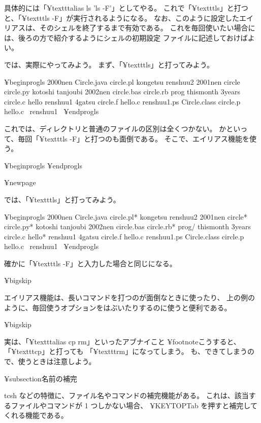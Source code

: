 具体的には「¥texttt{alias ls 'ls -F'}」としてやる。
これで「¥texttt{ls}」と打つと、「¥texttt{ls -F}」が実行されるようになる。
なお、このように設定したエイリアスは、そのシェルを終了するまで有効である。
これを毎回使いたい場合には、後ろの方で紹介するようにシェルの初期設定
ファイルに記述しておけばよい。

では、実際にやってみよう。
まず、「¥texttt{ls}」と打ってみよう。

¥begin{progls}
2000nen         Circle.java     circle.pl       kongetsu        renshuu2
2001nen         circle          circle.py       kotoshi         tanjoubi
2002nen         circle.bas      circle.rb       prog            thismonth
3years          circle.c        hello           renshuu1
4gatsu          circle.f        hello.c         renshuu1.ps
Circle.class    circle.p        hello.c~        renshuu1~
%
¥end{progls}

これでは、ディレクトリと普通のファイルの区別は全くつかない。
かといって、毎回「¥texttt{ls -F}」と打つのも面倒である。
そこで、エイリアス機能を使う。

¥begin{progls}
%
¥end{progls}

¥newpage

では、「¥texttt{ls}」と打ってみよう。

¥begin{progls}
2000nen         Circle.java     circle.pl*      kongetsu        renshuu2
2001nen         circle*         circle.py*      kotoshi         tanjoubi
2002nen         circle.bas      circle.rb*      prog/           thismonth
3years          circle.c        hello*          renshuu1
4gatsu          circle.f        hello.c         renshuu1.ps
Circle.class    circle.p        hello.c~        renshuu1~
%
¥end{progls}

確かに「¥texttt{ls -F}」と入力した場合と同じになる。

¥bigskip

エイリアス機能は、長いコマンドを打つのが面倒なときに使ったり、
上の例のように、毎回使うオプションをはぶいたりするのに使うと便利である。

¥bigskip

実は、「¥texttt{alias cp rm}」といったアブナイこと
¥footnote{こうすると、「¥texttt{cp}」と打っても
「¥texttt{rm}」になってしまう。}
も、できてしまうので、使うときは注意しよう。

¥subsection{名前の補完}

tcsh などの特徴に、ファイル名やコマンドの補完機能がある。
これは、該当するファイルやコマンドが 1 つしかない場合、
 ¥KEYTOP{Tab} を押すと補完してくれる機能である。

